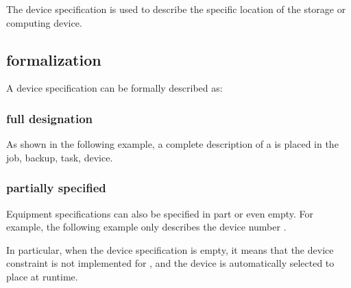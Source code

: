 \begin{content}

The device specification  is used to describe the specific location of the  storage or computing device.

\subsection{formalization}

A device specification can be formally described as:


\subsubsection{full designation}

As shown in the following example, a complete description of a  is placed in the  job,  backup,  task,  device.


\subsubsection{partially specified}

Equipment specifications can also be specified in part or even empty. For example, the following example only describes the device number .


In particular, when the device specification is empty, it means that the device constraint is not implemented for , and the device is automatically selected to place  at runtime.


\end{content}
